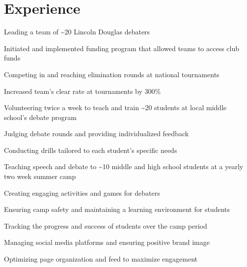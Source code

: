 \documentclass[letterpaper]{resume-shreeram}
\begin{document}


\section{Experience}

\begin{compactitem}
    \item Leading a team of \textasciitilde{}20 Lincoln Douglas debaters
    \item Initiated and implemented funding program that allowed teams to access club funds
    \item Competing in and reaching elimination rounds at national tournaments
    \item Increased team's clear rate at tournaments by 300\%
\end{compactitem}

\begin{compactitem}
    \item Volunteering twice a week to teach and train \textasciitilde{}20 students at local middle school's debate program
    \item Judging debate rounds and providing individualized feedback
    \item Conducting drills tailored to each student's specific needs
\end{compactitem}

\begin{compactitem}
    \item Teaching speech and debate to \textasciitilde{}10 middle and high school students at a yearly two week summer camp
    \item Creating engaging activities and games for debaters
    \item Ensuring camp safety and maintaining a learning environment for students
    \item Tracking the progress and success of students over the camp period
\end{compactitem}

\begin{compactitem}
    \item Managing social media platforms and ensuring positive brand image
    \item Optimizing page organization and feed to maximize engagement
\end{compactitem}
\end{document}

